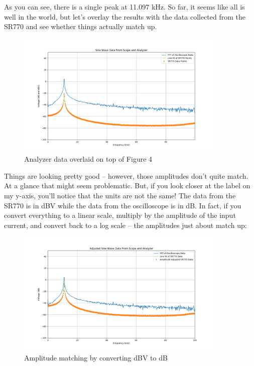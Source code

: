 \documentclass{article}
\begin{document}
As you can see, there is a single peak at 11.097 kHz. So far, it seems like all is well in the world, but let's overlay the results
with the data collected from the SR770 and see whether things actually match
up.

\begin{figure}[H]
    \centering
\begin{minipage}{11cm}
\begin{tcolorbox}
        \includegraphics[width=10cm, height=6.cm]{figures/figure5.png}
        \caption{Analyzer data overlaid on top of Figure 4}
        \label{fig:fig5}
\end{tcolorbox}
\end{minipage}
\end{figure}

Things are looking pretty good -- however, those amplitudes don't quite match.
At a glance that might seem problematic. But, if you look closer at the label
on my y-axis, you'll notice that the units are not the same! The data from the
SR770 is in dBV while the data from the oscilloscope is in dB. In fact, if you
convert everything to a linear scale, multiply by the amplitude of the input
current, and convert back to a log scale -- the amplitudes just about match up:

\begin{figure}[H]
    \centering
\begin{minipage}{11cm}
\begin{tcolorbox}
        \includegraphics[width=10cm, height=6.cm]{figures/figure6.png}
        \caption{Amplitude matching by converting dBV to dB}
        \label{fig:fig6}
\end{tcolorbox}
\end{minipage}
\end{figure}
\end{document}

